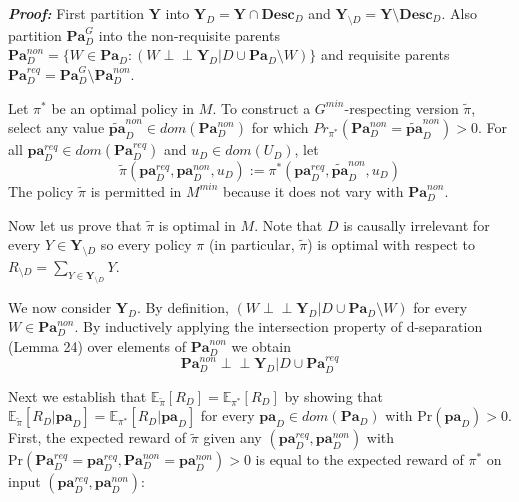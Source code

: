 \documentclass[letterpaper,10pt]{article}
\newcommand\indep{\perp \!\!\! \perp}
\begin{document}
\textbf{\emph{Proof:}}
First partition $\mathbf{Y}$ into $\mathbf{Y}_D=\mathbf{Y}\cap \textbf{Desc}_D$ and $\mathbf{Y}_{\setminus D}=\mathbf{Y}\setminus \textbf{Desc}_D$.
Also partition $\mathbf{Pa}_D^G$ into the non-requisite parents $\mathbf{Pa}^{non}_D=\{W\in \mathbf{Pa}_D : (W\indep \mathbf{Y}_D | D \cup \mathbf{Pa}_D \setminus W)\}$ and requisite parents $\mathbf{Pa}_D^{req}=\mathbf{Pa}_D^G\setminus\mathbf{Pa}^{non}_D$.

Let $\pi^*$ be an optimal policy in $M$.
To construct a $G^{min}$-respecting version $\tilde{\pi}$, select any value $\mathbf{\tilde{pa}}^{non}_D \in dom(\mathbf{Pa}^{non}_D)$ for which $Pr_{\pi^*}(\mathbf{Pa}^{non}_D = \mathbf{\tilde{pa}}^{non}_D)>0$.
For all $\mathbf{pa}_D^{req} \in dom(\mathbf{Pa}_D^{req})$ and $u_D \in dom(U_D)$, let
\[
\tilde{\pi}(\mathbf{pa}_D^{req},\mathbf{pa}^{non}_D,u_D) := \pi^*(\mathbf{pa}_D^{req},\mathbf{\tilde{pa}}^{non}_D,u_D)
\]
The policy $\tilde{\pi}$ is permitted in $M^{min}$ because it does not vary with $\mathbf{Pa}^{non}_D$.

Now let us prove that $\tilde{\pi}$ is optimal in $M$.
Note that $D$ is causally irrelevant for every $Y\in\mathbf{Y}_{\setminus D}$ so every policy $\pi$ (in particular, $\tilde{\pi}$) is optimal with respect to $R_{\setminus D}=\sum_{Y\in\mathbf{Y}_{\setminus D}}Y$.

We now consider $\mathbf{Y}_D$.
By definition, $(W\indep \mathbf{Y}_D | D \cup \mathbf{Pa}_D \setminus W)$ for every $W\in \mathbf{Pa}^{non}_D$.
By inductively applying the intersection property of d-separation (Lemma 24) over elements of $\mathbf{Pa}^{non}_D$ we obtain
\begin{equation}\label{intersected}
\mathbf{Pa}^{non}_D \indep \mathbf{Y}_D | D \cup \mathbf{Pa}^{req}_D
\end{equation}

Next we establish that $\mathbb{E}_{\tilde{\pi}} [R_{D}]=\mathbb{E}_{\pi^*} [R_{D}]$ by showing that $\mathbb{E}_{\tilde{\pi}} [R_{D}|\mathbf{pa}_D] = \mathbb{E}_{\pi^*} [R_{D}|\mathbf{pa}_D]$ for every $\mathbf{pa}_D\in dom(\mathbf{Pa}_D)$ with $\text{Pr}(\mathbf{pa}_D)>0$.
First, the expected reward of $\tilde{\pi}$ given any $(\mathbf{pa}_D^{req},\mathbf{pa}^{non}_D)$ with $\text{Pr}(\mathbf{Pa}_D^{req}=\mathbf{pa}_D^{req},\mathbf{Pa}^{non}_D=\mathbf{pa}^{non}_D)>0$ is equal to the expected reward of $\pi^*$ on input $(\mathbf{pa}_D^{req},\mathbf{pa}^{non}_D)$:
\end{document}
